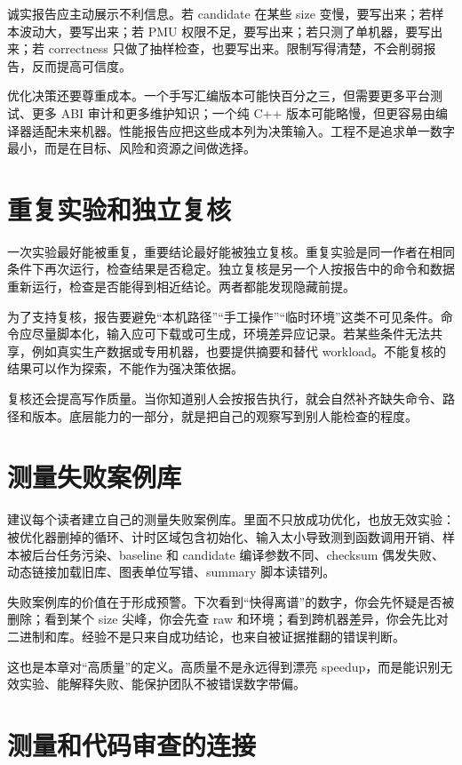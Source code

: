 诚实报告应主动展示不利信息。若 candidate 在某些 size 变慢，要写出来；若样本波动大，要写出来；若 PMU 权限不足，要写出来；若只测了单机器，要写出来；若 correctness 只做了抽样检查，也要写出来。限制写得清楚，不会削弱报告，反而提高可信度。

优化决策还要尊重成本。一个手写汇编版本可能快百分之三，但需要更多平台测试、更多 ABI 审计和更多维护知识；一个纯 C++ 版本可能略慢，但更容易由编译器适配未来机器。性能报告应把这些成本列为决策输入。工程不是追求单一数字最小，而是在目标、风险和资源之间做选择。

\section{重复实验和独立复核}

一次实验最好能被重复，重要结论最好能被独立复核。重复实验是同一作者在相同条件下再次运行，检查结果是否稳定。独立复核是另一个人按报告中的命令和数据重新运行，检查是否能得到相近结论。两者都能发现隐藏前提。

为了支持复核，报告要避免“本机路径”“手工操作”“临时环境”这类不可见条件。命令应尽量脚本化，输入应可下载或可生成，环境差异应记录。若某些条件无法共享，例如真实生产数据或专用机器，也要提供摘要和替代 workload。不能复核的结果可以作为探索，不能作为强决策依据。

复核还会提高写作质量。当你知道别人会按报告执行，就会自然补齐缺失命令、路径和版本。底层能力的一部分，就是把自己的观察写到别人能检查的程度。

\section{测量失败案例库}

建议每个读者建立自己的测量失败案例库。里面不只放成功优化，也放无效实验：被优化器删掉的循环、计时区域包含初始化、输入太小导致测到函数调用开销、样本被后台任务污染、baseline 和 candidate 编译参数不同、checksum 偶发失败、动态链接加载旧库、图表单位写错、summary 脚本读错列。

失败案例库的价值在于形成预警。下次看到“快得离谱”的数字，你会先怀疑是否被删除；看到某个 size 尖峰，你会先查 raw 和环境；看到跨机器差异，你会先比对二进制和库。经验不是只来自成功结论，也来自被证据推翻的错误判断。

这也是本章对“高质量”的定义。高质量不是永远得到漂亮 speedup，而是能识别无效实验、能解释失败、能保护团队不被错误数字带偏。

\section{测量和代码审查的连接}

